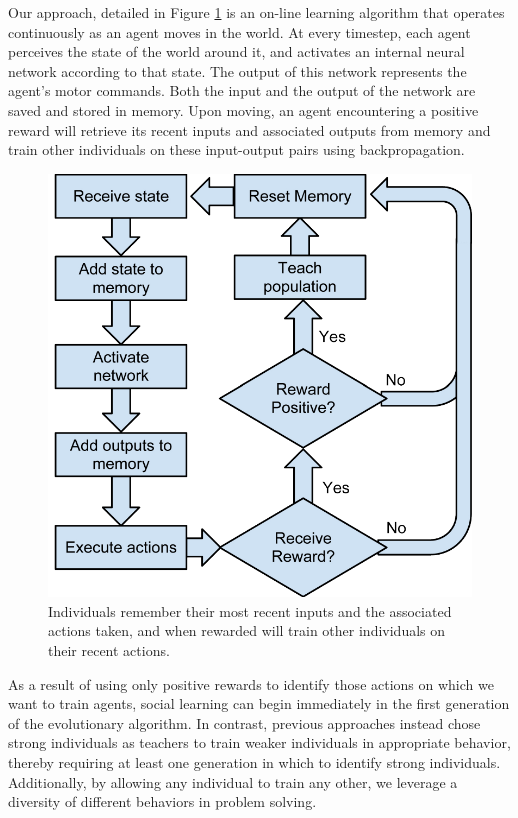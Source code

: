 \documentclass{acm_proc_article-sp}
\begin{document}
Our approach, detailed in Figure \ref{fig:flowchart} is an on-line learning algorithm that operates continuously as an agent moves in the world. At every timestep, each agent perceives the state of the world around it, and activates an internal neural network according to that state. The output of this network represents the agent's motor commands. Both the input and the output of the network are saved and stored in memory. Upon moving, an agent encountering a positive reward will retrieve its recent inputs and associated outputs from memory and train other individuals on these input-output pairs using backpropagation.

\begin{figure}
  \centering
    \includegraphics[scale=.6]{flowchart.pdf}
  \caption{Individuals remember their most recent inputs and the associated actions taken, and when rewarded will train other individuals on their recent actions.}
  \label{fig:flowchart}
\end{figure}


As a result of using only positive rewards to identify those actions on which we want to train agents, social learning can begin immediately in the first generation of the evolutionary algorithm. In contrast, previous approaches \cite{denaro1996cultural} instead chose strong individuals as teachers to train weaker individuals in appropriate behavior, thereby requiring at least one generation in which to identify strong individuals. Additionally, by allowing any individual to train any other, we leverage a diversity of different behaviors in problem solving.
 
\end{document}
